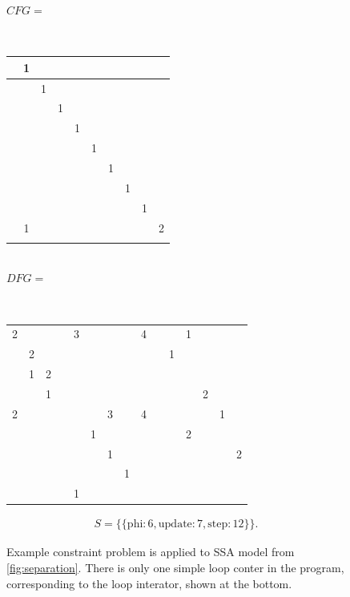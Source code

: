 \begin{figure}
\begin{minipage}{0.27\textwidth}
$CFG=$\\[1pt]{
\tiny\tt\bf
\setlength{\tabcolsep}{1pt}
\renewcommand{\arraystretch}{0.7}
\begin{tabular}{|c|c|c|c|c|c|c|c|c|c|}
\hline
\hphantom{1}&1&&&&&&&&\\[-0.5mm]
\hline
&&1&&&&&&&\\[-0.5mm]
\hline
&&&1&&&&&&\\[-0.5mm]
\hline
&&&&1&&&&&\\[-0.5mm]
\hline
&&&&&1&&&&\\[-0.5mm]
\hline
&&&&&&1&&&\\[-0.5mm]
\hline
&&&&&&&1&&\\[-0.5mm]
\hline
&&&&&&&&1&\\[-0.5mm]
\hline
&1&&&&&&&&2\\[-0.5mm]
\hline
&&&&&&&&&\\
\hline
\end{tabular}}\\[0.75em]
$DFG=$\\[1pt]{
\tiny\tt\bf
\setlength{\tabcolsep}{1pt}
\renewcommand{\arraystretch}{0.7}
\begin{tabular}{|c|c|c|c|c|c|c|c|c|c||c||c|c|c||c|}
\hline
\hphantom{1}&&&\hphantom{1}&&&&&\hphantom{1}&\hphantom{1}&&&&&\\
\hline
2&&&&3&&&&4&&&1&&&\\[-0.5mm]
\hline
&2&&&&&&&&&1&&&&\\[-0.5mm]
\hline
&1&2&&&&&&&&&&&&\\[-0.5mm]
\hline
&&1&&&&&&&&&&2&&\\[-0.5mm]
\hline
2&&&&&&3&&4&&&&&1&\\[-0.5mm]
\hline
&&&&&1&&&&&&2&&&\\[-0.5mm]
\hline
&&&&&&1&&&&&&&&2\\[-0.5mm]
\hline
&&&&&&&1&&&&&&&\\[-0.5mm]
\hline
&&&&1&&&&&&&&&&\\
\hline
\end{tabular}}
\end{minipage}

\begin{align*}
S=\{\{\text{phi}:6,\text{update}:7,\text{step}:12\}\}.
\end{align*}

\caption{Example constraint problem is applied to SSA model from
         \autoref{fig:separation}.
         There is only one simple loop conter in the program, corresponding to
         the loop interator, shown at the bottom.}
\end{figure}

